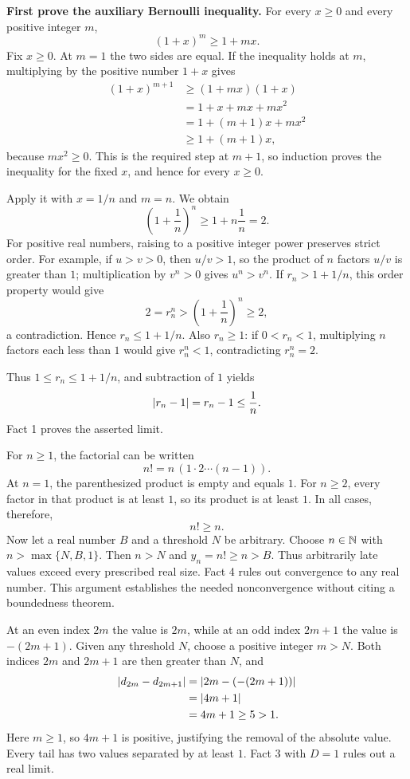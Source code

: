 \textbf{First prove the auxiliary Bernoulli inequality.}
For every $x\geq0$ and every positive integer $m$,
\[
 (1+x)^m\geq1+mx.
\]
Fix $x\geq0$. At $m=1$ the two sides are equal. If the inequality
holds at $m$, multiplying by the positive number $1+x$ gives
\begin{align*}
 (1+x)^{m+1}
 &\geq(1+mx)(1+x)\\
 &=1+x+mx+mx^2\\
 &=1+(m+1)x+mx^2\\
 &\geq1+(m+1)x,
\end{align*}
because $mx^2\geq0$. This is the required step at $m+1$,
so induction proves the inequality for the fixed $x$, and hence
for every $x\geq0$.

Apply it with $x=1/n$ and $m=n$. We obtain
\[
 \left(1+\frac1n\right)^n
 \geq1+n\frac1n=2.
\]
For positive real numbers, raising to a positive integer power
preserves strict order. For example, if $u>v>0$, then
$u/v>1$, so the product of $n$ factors $u/v$ is greater than
$1$; multiplication by $v^n>0$ gives $u^n>v^n$.
If $r_n>1+1/n$, this order property would give
\[
 2=r_n^n>\left(1+\frac1n\right)^n\geq2,
\]
a contradiction. Hence $r_n\leq1+1/n$. Also $r_n\geq1$:
if $0<r_n<1$, multiplying $n$ factors each less than $1$
would give $r_n^n<1$, contradicting $r_n^n=2$.

Thus $1\leq r_n\leq1+1/n$, and subtraction of $1$ yields
\[
 \left|r_n-1\right|=r_n-1\leq\frac1n.
\]
Fact 1 proves the asserted limit.


For $n\geq1$, the factorial can be written
\[
 n!=n\,(1\cdot2\cdots(n-1)).
\]
At $n=1$, the parenthesized product is empty and equals $1$.
For $n\geq2$, every factor in that product is at least $1$,
so its product is at least $1$. In all cases, therefore,
\[
 n!\geq n.
\]
Now let a real number $B$ and a threshold $N$ be arbitrary.
Choose $n\in\mathbb{N}$ with $n>\max\{N,B,1\}$. Then $n>N$ and
$y_n=n!\geq n>B$. Thus arbitrarily late values exceed every
prescribed real size. Fact 4 rules out convergence to any real
number. This argument establishes the needed nonconvergence
without citing a boundedness theorem.


At an even index $2m$ the value is $2m$, while at an odd index
$2m+1$ the value is $-(2m+1)$. Given any threshold $N$, choose
a positive integer $m>N$. Both indices $2m$ and $2m+1$ are then
greater than $N$, and
\begin{align*}
 \left|d_{2m}-d_{2m+1}\right|
 &=\left|2m-(-(2m+1))\right|\\
 &=\left|4m+1\right|\\
 &=4m+1\geq5>1.
\end{align*}
Here $m\geq1$, so $4m+1$ is positive, justifying the removal
of the absolute value. Every tail has two values separated by
at least $1$. Fact 3 with $D=1$ rules out a real limit.


